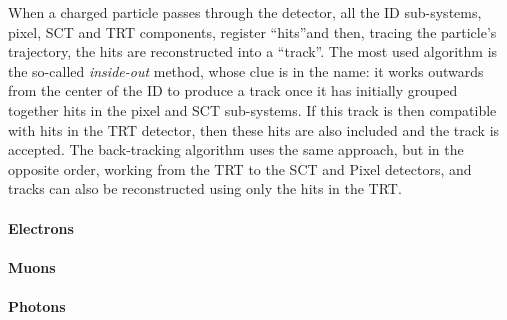 			When a charged particle passes through the detector, all the \ac{ID} sub-systems, pixel, \ac{SCT} and \ac{TRT} components, register ``hits''and then, tracing the particle's trajectory, the hits are reconstructed into a ``track''. The most used algorithm is the so-called \emph{inside-out} method, whose clue is in the name: it works outwards from the center of the \ac{ID} to produce a track once it has initially grouped together hits in the pixel and \ac{SCT} sub-systems. If this track is then compatible with hits in the \ac{TRT} detector, then these hits are also included and the track is accepted. The back-tracking algorithm uses the same approach, but in the opposite order, working from the \ac{TRT} to the \ac{SCT} and Pixel detectors, and tracks can also be reconstructed using only the hits in the \ac{TRT}. 



		\paragraph*{Electrons}

		\paragraph*{Muons}

		\paragraph*{Photons}

